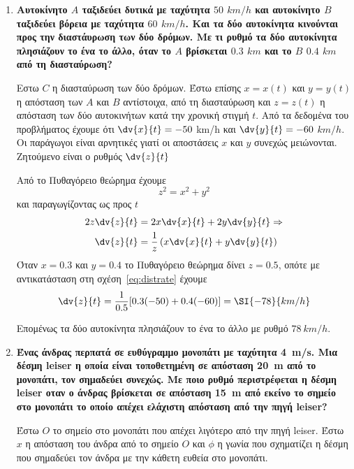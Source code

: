\begin{enumerate}
\item  {\bfseries \boldmath Αυτοκίνητο $A$ ταξιδεύει δυτικά με ταχύτητα $50$
	$\si{km\per h}$ και αυτοκίνητο $B$ ταξιδεύει βόρεια με ταχύτητα $60$
$\si{km/h}$. Και τα δύο αυτοκίνητα κινούνται προς την διαστάυρωση των δύο δρόμων. Με τι ρυθμό τα δύο αυτοκίνητα πλησιάζουν το ένα το άλλο, όταν το $A$ βρίσκεται $0.3$ $\si{km}$ και το $B$ $0.4$ $\si{km}$ από τη διασταύρωση?}


	\vspace{\baselineskip}

	Εστω $C$ η διασταύρωση των δύο δρόμων. Έστω επίσης $x=x(t)$ και $y=y(t)$ η απόσταση των $A$ και $B$ αντίστοιχα, από τη διασταύρωση  και $z=z(t)$ η απόσταση των δύο αυτοκινήτων κατά την χρονική στιγμή $t$.
	Από τα δεδομένα του προβλήματος έχουμε ότι $\dv{x}{t}=-50$ \si{km/h} και
	$\dv{y}{t}=-60$ $\si{km/h}$. Οι παράγωγοι είναι αρνητικές γιατί οι αποστάσεις $x$ και $y$ συνεχώς μειώνονται. Ζητούμενο είναι ο ρυθμός $\dv{z}{t}$

	Από το Πυθαγόρειο θεώρημα έχουμε
	\[
		z^{2}=x^{2}+y^{2}
	\]
	και παραγωγίζοντας ως προς $t$
	\begin{align} \label{eq:distrate}
2z\dv{z}{t} &= 2x\dv{x}{t} + 2y\dv{y}{t} \notag \Rightarrow \\
\dv{z}{t} &= \frac{1}{z}\left(x\dv{x}{t}+y\dv{y}{t}\right)
\end{align}
Όταν $x=0.3$ και $y=0.4$ το Πυθαγόρειο θεώρημα δίνει $z=0.5$, οπότε με αντικατάσταση στη σχέση~\eqref{eq:distrate} έχουμε
\[
	\dv{z}{t}=\frac{1}{0.5}[0.3(-50)+0.4(-60)] = \SI{-78}{km/h}
\]

Επομένως τα δύο αυτοκίνητα πλησιάζουν το ένα το άλλο με ρυθμό $\SI{78}{km/h}$.



\item {\bfseries \boldmath Ένας άνδρας περπατά σε ευθύγραμμο μονοπάτι με ταχύτητα \SI{4}{m/s}. Μια δέσμη \textlatin{leiser} η οποία είναι τοποθετημένη σε απόσταση \SI{20}{m} από το μονοπάτι, τον σημαδεύει συνεχώς. Με ποιο ρυθμό περιστρέφεται η δέσμη \textlatin{leiser} οταν ο άνδρας βρίσκεται σε απόσταση \SI{15}{m} από εκείνο το σημείο στο μονοπάτι το οποίο απέχει ελάχιστη απόσταση από την πηγή \textlatin{leiser}?}


	\vspace{\baselineskip}
	Έστω $O$ το σημείο στο μονοπάτι που απέχει λιγότερο από την πηγή \textlatin{leiser}.
	Έστω $x$ η απόσταση του άνδρα από το σημείο $O$ και $\phi$ η γωνία που σχηματίζει η δέσμη που σημαδεύει τον άνδρα με την κάθετη ευθεία στο μονοπάτι.


\end{enumerate}
